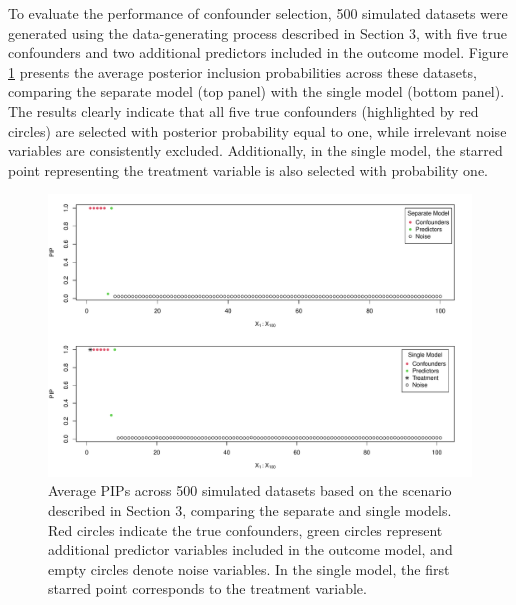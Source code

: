 To evaluate the performance of confounder selection, 500 simulated datasets were generated using the data-generating process described in Section 3, with five true confounders and two additional predictors included in the outcome model. Figure \ref{Fig:A1} presents the average posterior inclusion probabilities across these datasets, comparing the separate model (top panel) with the single model (bottom panel). The results clearly indicate that all five true confounders (highlighted by red circles) are selected with posterior probability equal to one, while irrelevant noise variables are consistently excluded. Additionally, in the single model, the starred point representing the treatment variable is also selected with probability one.
\begin{figure}[htbp]
\includegraphics[width=\linewidth]{fig/pip_s1.pdf}
\caption{Average PIPs across 500 simulated datasets based on the scenario described in Section 3, comparing the separate and single models. Red circles indicate the true confounders, green circles represent additional predictor variables included in the outcome model, and empty circles denote noise variables. In the single model, the first starred point corresponds to the treatment variable.} \label{Fig:A1}
\end{figure}

